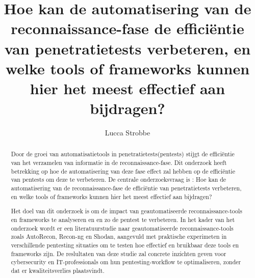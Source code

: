 \documentclass{hogent-article}
\title{Hoe kan de automatisering van de reconnaissance-fase de efficiëntie van penetratietests verbeteren, en welke tools of frameworks kunnen hier het meest \newline effectief aan bijdragen?}
\author{Lucca Strobbe}
\begin{document}
 

\begin{abstract}
  Door de groei van automatisatietools in penetratietests(pentests) stijgt de efficiëntie van het verzamelen van informatie in de reconnaissance-fase. 
  Dit onderzoek heeft betrekking op hoe de automatisering van deze fase effect zal hebben
  op de efficiëntie van pentests om deze te verbeteren. De centrale onderzoeksvraag is : Hoe kan de automatisering van de reconnaissance-fase de efficiëntie van penetratietests verbeteren, en welke tools of frameworks kunnen hier het meest effectief aan bijdragen?
  

  Het doel van dit onderzoek is om de impact van geautomatiseerde reconnaissance-tools en frameworks te analyseren en en zo de pentest te verbeteren. 
  In het kader van het onderzoek wordt er een literatuurstudie naar geautomatiseerde reconnaissance-tools zoals AutoRecon, Recon-ng en Shodan, aangevuld met praktische 
  experimeten in verschillende pentesting situaties om te testen hoe effectief en bruikbaar deze tools en frameworks zijn. De reslultaten van deze studie zal concrete 
  inzichten geven voor cybersecurity en IT-professionals om hun pentesting-workflow te optimaliseren, zonder dat er kwaliteitsverlies plaatsvindt.

\end{abstract}

\tableofcontents



\printbibliography[heading=bibintoc]
\end{document}
